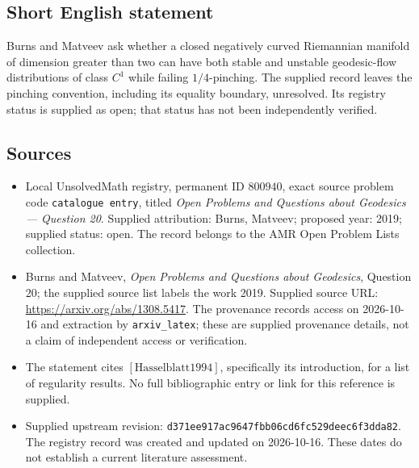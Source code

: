 \documentclass[11pt]{article}
\begin{document}
\subsection{Short English statement}
Burns and Matveev ask whether a closed negatively curved Riemannian manifold of dimension greater than two can have both stable and unstable geodesic-flow distributions of class \(C^1\) while failing \(1/4\)-pinching. The supplied record leaves the pinching convention, including its equality boundary, unresolved. Its registry status is supplied as open; that status has not been independently verified.
\subsection{Sources}
\begin{itemize}
\item Local UnsolvedMath registry, permanent ID \(800940\), exact source problem code \texttt{catalogue entry}, titled \emph{Open Problems and Questions about Geodesics --- Question 20}. Supplied attribution: Burns, Matveev; proposed year: 2019; supplied status: open. The record belongs to the AMR Open Problem Lists collection.
\item Burns and Matveev, \emph{Open Problems and Questions about Geodesics}, Question 20; the supplied source list labels the work 2019. Supplied source URL: \url{https://arxiv.org/abs/1308.5417}. The provenance records access on 2026-10-16 and extraction by \texttt{arxiv\_latex}; these are supplied provenance details, not a claim of independent access or verification.
\item The statement cites \([\mathrm{Hasselblatt1994}]\), specifically its introduction, for a list of regularity results. No full bibliographic entry or link for this reference is supplied.
\item Supplied upstream revision: \texttt{d371ee917ac9647fbb06cd6fc529deec6f3dda82}. The registry record was created and updated on 2026-10-16. These dates do not establish a current literature assessment.
\end{itemize}
\end{document}
